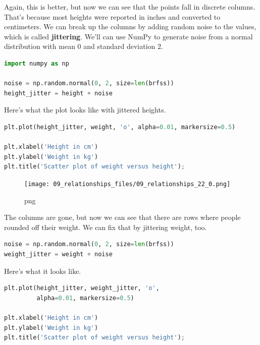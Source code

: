 \documentclass[
]{book}
\begin{document}
Again, this is better, but now we can see that the points fall in
discrete columns. That's because most heights were reported in inches
and converted to centimeters. We can break up the columns by adding
random noise to the values, which is called \textbf{jittering}. We'll
can use NumPy to generate noise from a normal distribution with mean 0
and standard deviation 2.

\begin{lstlisting}[language=Python]
import numpy as np

noise = np.random.normal(0, 2, size=len(brfss))
height_jitter = height + noise
\end{lstlisting}

Here's what the plot looks like with jittered heights.

\begin{lstlisting}[language=Python]
plt.plot(height_jitter, weight, 'o', alpha=0.01, markersize=0.5)

plt.xlabel('Height in cm')
plt.ylabel('Weight in kg')
plt.title('Scatter plot of weight versus height');
\end{lstlisting}

\begin{figure}
\centering
\texttt{[image: 09\_relationships\_files/09\_relationships\_22\_0.png]}
\caption{png}
\end{figure}

The columns are gone, but now we can see that there are rows where
people rounded off their weight. We can fix that by jittering weight,
too.

\begin{lstlisting}[language=Python]
noise = np.random.normal(0, 2, size=len(brfss))
weight_jitter = weight + noise
\end{lstlisting}

Here's what it looks like.

\begin{lstlisting}[language=Python]
plt.plot(height_jitter, weight_jitter, 'o', 
         alpha=0.01, markersize=0.5)

plt.xlabel('Height in cm')
plt.ylabel('Weight in kg')
plt.title('Scatter plot of weight versus height');
\end{lstlisting}
\end{document}
